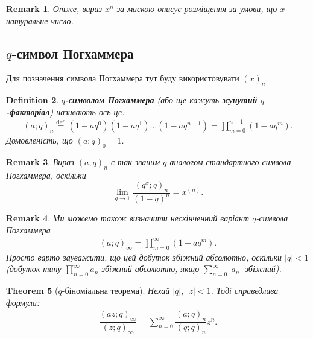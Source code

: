 \documentclass[a4paper, 14pt]{extarticle}
\theoremstyle{theoremdd}
\newtheorem{theorem}{Theorem}[subsection]
\theoremstyle{theoremdd}
\newtheorem{definition}[theorem]{Definition}
\theoremstyle{theoremdd}
\theoremstyle{theoremdd}
\theoremstyle{theoremdd}
\theoremstyle{theoremdd}
\theoremstyle{theoremdd}
\theoremstyle{theoremdd}
\theoremstyle{theoremdd}
\theoremstyle{theoremdd}
\theoremstyle{theoremdd}
\newtheorem{remark}[theorem]{Remark}
\theoremstyle{theoremdd}
\theoremstyle{theoremdd}
\theoremstyle{theoremdd}
\theoremstyle{theoremdd}
\begin{document}
\begin{remark}
Отже, вираз $x^{\overline{n}}$ за маскою описує розміщення за умови, що $x$ --- натуральне число.
\end{remark}

\subsection{$q$-символ Погхаммера}
Для позначення символа Погхаммера тут буду використовувати $(x)_n$. 
\begin{definition}
\textbf{$q$-символом Погхаммера} (або ще кажуть \textbf{зсунутий $q$-факторіал}) називають ось це:
\begin{align*}
(a;q)_n \overset{\text{def.}}{=} (1-aq^0)(1-aq^1) \dots (1-aq^{n-1}) = \prod_{m=0}^{n-1} (1-aq^m).
\end{align*}
Домовленість, що $(a;q)_0 = 1$.
\end{definition}

\begin{remark}
Вираз $(a;q)_n$ є так званим $q$-аналогом стандартного символа Погхаммера, оскільки
\[
\lim_{q \to 1} \dfrac{(q^x;q)_n}{(1-q)^n} = x^{(n)}.
\]
\end{remark}

\begin{remark}
Ми можемо також визначити нескінченний варіант $q$-символа Погхаммера
\begin{align*}
(a;q)_{\infty} = \prod_{m=0}^\infty (1-aq^m).
\end{align*}
Просто варто зауважити, що цей добуток збіжний абсолютно, оскільки $|q| < 1$ (\textit{добуток типу $\prod_{n=0}^\infty a_n$ збіжний абсолютно, якщо $\sum_{n=0}^\infty |a_n|$ збіжний}).
\end{remark}

\begin{theorem}[$q$-біноміальна теорема]
Нехай $|q|,\ |z| < 1$. Тоді справедлива формула:
\begin{align*}
\dfrac{(az;q)_\infty}{(z;q)_\infty} = \sum_{n=0}^\infty \dfrac{(a;q)_n}{(q;q)_n} z^n.
\end{align*}
\end{theorem}
\end{document}
